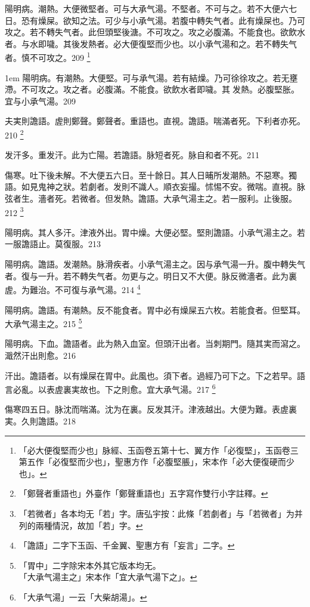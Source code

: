 陽明病。潮熱。大便微堅者。可与{\khaaitp 大}承气湯。不堅者。不可与之。若不大便六七日。恐有燥屎。欲知之法。可少与小承气湯。若腹中轉失气者。此有燥屎也。乃可攻之。若不轉失气者。此但頭堅後溏。不可攻之。攻之必腹滿。不能食也。欲飲水者。与水即噦。其後发熱者。必大便復堅而少也。以小承气湯和之。若不轉失气者。慎不可攻之。209
	\footnote{「必大便復堅而少也」脉經、玉函卷五第十七、翼方作「必復堅」，玉函卷三第五作「必復堅而少也」，聖惠方作「必腹堅脹」，宋本作「必大便復硬而少也」。}

\hangindent 1em
陽明病。有潮熱。大便堅。可与承气湯。若有結燥。乃可徐徐攻之。若无壅滯。不可攻之。攻之者。必腹滿。不能食。欲飲水者即噦。其{\sungtpii 𠊱}发熱。必腹堅胀。宜与小承气湯。{\gaoben}209

夫実則譫語。虗則鄭聲。鄭聲者。重語也。直視。譫語。喘滿者死。下利者亦死。210
	\footnote{「鄭聲者重語也」外臺作「鄭聲重語也」五字寫作雙行小字註釋。}

发汗多。重发汗。{\khaaitp 此为}亡陽。{\khaaitp 若}譫語。脉短者死。脉自和者不死。211

傷寒。吐下後未解。不大便五六日。至十餘日。其人日晡所发潮熱。不惡寒。獨語。如見鬼{\khaaitp 神之}狀。若劇者。发則不識人。順衣妄撮。怵惕不安。微喘。直視。脉弦者生。濇者死。{\khaaitp 若}微者。但发熱。譫語。{\khaaitp 大}承气湯主之。若一服利。止後服。212
	\footnote{
		「若微者」各本均无「若」字。唐弘宇按：此條「若劇者」与「若微者」为并列的兩種情況，故加「若」字。
	}

陽明病。其人多汗。津液外出。胃中燥。大便必堅。堅則譫語。{\khaaitp 小}承气湯主之。{\khaaitp 若一服譫語止。莫復服。}213

陽明病。譫語。发潮熱。脉滑疾者。{\khaaitp 小}承气湯主之。因与承气湯一升。腹中轉失气者。復与一升。若不轉失气者。勿更与之。明日又不大便。脉反微濇者。此为裏虗。为難治。不可復与承气湯。214
	\footnote{「譫語」二字下玉函、千金翼、聖惠方有「妄言」二字。}

陽明病。譫語。有潮熱。反不能食者。{\khaaitp 胃中}必有燥屎五六枚。若能食者。但堅耳。{\khaaitp 大}承气湯主之。215
	\footnote{「胃中」二字除宋本外其它版本均无。\\「大承气湯主之」宋本作「宜大承气湯下之」。}

陽明病。下血。譫語者。此为熱入血室。但頭汗出者。当刺期門。隨其実而瀉之。濈然汗出則愈。216

汗出。譫語者。以有燥屎在胃中。此風也。{\khaaitp 須下者。}過經乃可下之。下之若早。語言必亂。以表虗裏実故也。下之則愈。宜{\khaaitp 大}承气湯。217
	\footnote{「大承气湯」一云「大柴胡湯」。}

傷寒四五日。脉沈而喘滿。沈为在裏。反发其汗。津液越出。大便为難。表虗裏実。久則譫語。218

